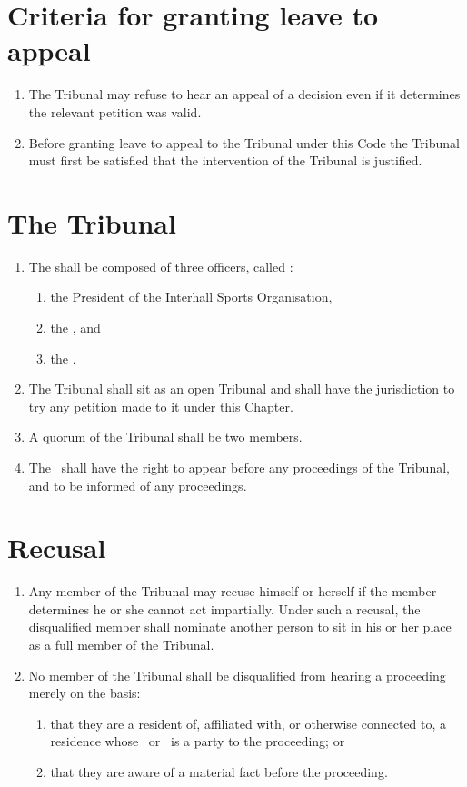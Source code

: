 \documentclass[12pt]{report}
\begin{document}
  \section{Criteria for granting leave to appeal}
  \begin{enumerate}
    \item The Tribunal may refuse to hear an appeal of a decision even if it determines the relevant petition was valid.
    \item Before granting leave to appeal to the Tribunal under this Code the Tribunal must first be satisfied that the intervention of the Tribunal is justified.
  \end{enumerate}
  \section{The Tribunal}
  \begin{enumerate}
    \item The  shall be composed of three officers, called :
    \begin{enumerate}
      \item the President of the Interhall Sports Organisation,
      \item the \RaceDirector, and
      \item the \CourseSetter.
    \end{enumerate}
    \item The Tribunal shall sit as an open Tribunal and shall have the jurisdiction to try any petition made to it under this Chapter.
    \item A quorum of the Tribunal shall be two members.
    \item The \Referee\ shall have the right to appear before any proceedings of the Tribunal, and  to be informed of any proceedings.
  \end{enumerate}
  \section{Recusal}
  \begin{enumerate}
    \item Any member of the Tribunal may recuse himself or herself if the member determines he or she cannot act impartially. Under such a recusal, the disqualified member shall nominate another person to sit in his or her place as a full member of the Tribunal.
     \item No member of the Tribunal shall be disqualified from hearing a proceeding merely on the basis:
     \begin{enumerate}
       \item that they are a resident of, affiliated with, or otherwise connected to, a residence whose \Captain\ or \President\ is a party to the proceeding; or
       \item that they are aware of a material fact before the proceeding.
     \end{enumerate}
  \end{enumerate}
\end{document}
